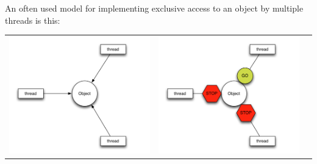 An often used model for implementing exclusive access to an object by multiple threads is this:

\begin{table}[h!]
	\begin{tabular}{ c  c  c }
	  \begin{minipage}{.3\textwidth}
		  \includegraphics[width=\linewidth]{images/TraditionalLock01.png} 
		\end{minipage} 
		&
	  \begin{minipage}{.3\textwidth}
		  \includegraphics[width=\linewidth]{images/TraditionalLock02.png} 

\end{minipage}
\end{tabular}
\end{table}
